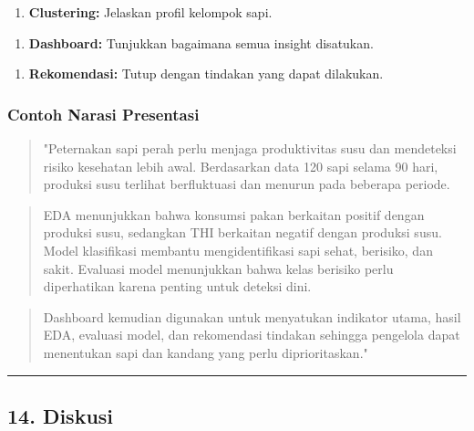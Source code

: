 \documentclass[12pt,a4paper]{article}
\begin{document}
\begin{enumerate}
\item \textbf{Clustering:} Jelaskan profil kelompok sapi.
\end{enumerate}

\begin{enumerate}
\item \textbf{Dashboard:} Tunjukkan bagaimana semua insight disatukan.
\end{enumerate}

\begin{enumerate}
\item \textbf{Rekomendasi:} Tutup dengan tindakan yang dapat dilakukan.
\end{enumerate}


\subsubsection{Contoh Narasi Presentasi}

\begin{quote}
"Peternakan sapi perah perlu menjaga produktivitas susu dan mendeteksi risiko kesehatan lebih awal. Berdasarkan data 120 sapi selama 90 hari, produksi susu terlihat berfluktuasi dan menurun pada beberapa periode.\end{quote}

\begin{quote}
\end{quote}

\begin{quote}
EDA menunjukkan bahwa konsumsi pakan berkaitan positif dengan produksi susu, sedangkan THI berkaitan negatif dengan produksi susu. Model klasifikasi membantu mengidentifikasi sapi sehat, berisiko, dan sakit. Evaluasi model menunjukkan bahwa kelas berisiko perlu diperhatikan karena penting untuk deteksi dini.\end{quote}

\begin{quote}
\end{quote}

\begin{quote}
Dashboard kemudian digunakan untuk menyatukan indikator utama, hasil EDA, evaluasi model, dan rekomendasi tindakan sehingga pengelola dapat menentukan sapi dan kandang yang perlu diprioritaskan."\end{quote}


\hrule


\subsection{14. Diskusi}
\end{document}
